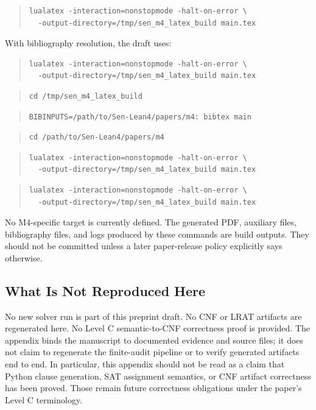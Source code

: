 \begin{quote}
\small
\begin{verbatim}
lualatex -interaction=nonstopmode -halt-on-error \
  -output-directory=/tmp/sen_m4_latex_build main.tex
\end{verbatim}
\end{quote}

With bibliography resolution, the draft uses:

\begin{quote}
\small
\begin{verbatim}
lualatex -interaction=nonstopmode -halt-on-error \
  -output-directory=/tmp/sen_m4_latex_build main.tex
\end{verbatim}
\end{quote}
\begin{quote}
\small
\begin{verbatim}
cd /tmp/sen_m4_latex_build
\end{verbatim}
\end{quote}
\begin{quote}
\small
\begin{verbatim}
BIBINPUTS=/path/to/Sen-Lean4/papers/m4: bibtex main
\end{verbatim}
\end{quote}
\begin{quote}
\small
\begin{verbatim}
cd /path/to/Sen-Lean4/papers/m4
\end{verbatim}
\end{quote}
\begin{quote}
\small
\begin{verbatim}
lualatex -interaction=nonstopmode -halt-on-error \
  -output-directory=/tmp/sen_m4_latex_build main.tex
\end{verbatim}
\end{quote}
\begin{quote}
\small
\begin{verbatim}
lualatex -interaction=nonstopmode -halt-on-error \
  -output-directory=/tmp/sen_m4_latex_build main.tex
\end{verbatim}
\end{quote}

No M4-specific \code{make} target is currently defined.
The generated PDF, auxiliary files, bibliography files, and logs produced by
these commands are build outputs. They should not be committed unless a later
paper-release policy explicitly says otherwise.

\subsection{What Is Not Reproduced Here}

No new solver run is part of this preprint draft. No CNF or LRAT artifacts are
regenerated here. No Level C semantic-to-CNF correctness proof is provided.
The appendix binds the manuscript to documented evidence and source files; it
does not claim to regenerate the finite-audit pipeline or to verify generated
artifacts end to end. In particular, this appendix should not be read as a
claim that Python clause generation, SAT assignment semantics, or CNF artifact
correctness has been proved. Those remain future correctness obligations under
the paper's Level C terminology.
